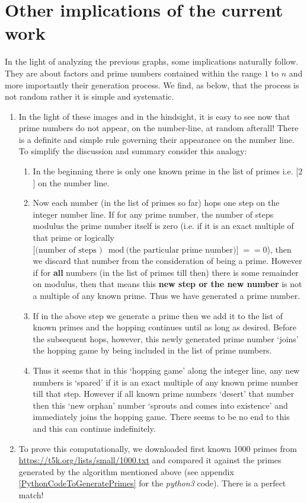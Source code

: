 \documentclass[10pt, twoside]{article}
\begin{document}
\section{Other implications of the current work}
In the light of analyzing the previous graphs, some implications naturally follow. They are about factors and prime numbers contained within the range $1$ to $n$ and more importantly their generation process. We find, as below, that the process is not random rather it is simple and systematic.	 
\begin{enumerate}
	\item In the light of these images and in the hindsight, it is easy to see now that prime numbers do not appear, on the number-line, at random afterall! There is a definite and simple rule governing their appearance on the number line. To simplify the discussion and summary consider this analogy: 
	\begin{enumerate}
	\item In the beginning there is only one known prime in the list of primes i.e. [$2$] on the number line. 
	\item Now each number (in the list of primes so far) hops one step on the integer number line. If for any prime number, the number of steps modulus the prime number itself is zero (i.e. if it is an exact multiple of that prime or logically $\text{[(number of steps )} \mod \text{(the particular prime number)]} == 0$), then we discard that number from the consideration of being a prime. However if for \textbf{all} numbers (in the list of primes till then) there is some remainder on modulus, then that means this \textbf{new step or the new number} is not a multiple of any known prime. Thus we have generated a prime number.
	\item If in the above step we generate a prime then we add it to the list of known primes and the hopping continues until as long as desired. Before the subsequent hops, however, this newly generated prime number `joins' the hopping game by being included in the list of prime numbers.
	\item Thus it seems that in this `hopping game' along the integer line, any new numbers is `spared' if it is an exact multiple of any known prime number till that step. However if all known prime numbers `desert' that number then this `new orphan' number `sprouts and comes into existence' and immediately joins the hopping game. There seems to be no end to this and this can continue indefinitely.
	\end{enumerate}
	\item To prove this computationally, we downloaded first known 1000 primes from \url{https://t5k.org/lists/small/1000.txt}  and compared it against the primes generated by the algorithm mentioned above (see appendix \ref{PythonCodeToGeneratePrimes} for the \textit{python3} code). There is a perfect match!\label{PrimeNumberGeneration}
	
\end{enumerate}
\end{document}
